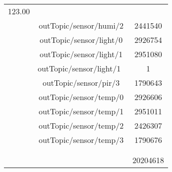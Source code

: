 \begin{tabular}{ccc}
    123.00&&\\
&outTopic/sensor/humi/2&         2441540\\
&outTopic/sensor/light/0&         2926754\\
&outTopic/sensor/light/1&         2951080\\
&outTopic/sensor/light/1 &               1\\
&outTopic/sensor/pir/3&         1790643\\
&outTopic/sensor/temp/0&         2926606\\
&outTopic/sensor/temp/1&         2951011\\
&outTopic/sensor/temp/2&         2426307\\
&outTopic/sensor/temp/3&         1790676\\
&&\\
&&\\
&&        20204618
\end{tabular}
